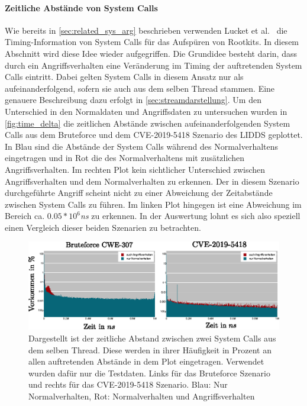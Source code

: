             \paragraph{Zeitliche Abstände von System Calls}

                Wie bereits in \autoref{sec:related_sys_arg} beschrieben verwenden Lucket et al.~\cite{TIMINGLUCKETT2016} die Timing-Information von System Calls für das Aufspüren von Rootkits.
                In diesem Abschnitt wird diese Idee wieder aufgegriffen.
                Die Grundidee besteht darin, dass durch ein Angriffsverhalten eine Veränderung im Timing der auftretenden System Calls eintritt.
                Dabei gelten System Calls in diesem Ansatz nur als aufeinanderfolgend, sofern sie auch aus dem selben Thread stammen.
                Eine genauere Beschreibung dazu erfolgt in \autoref{sec:streamdarstellung}.
                Um den Unterschied in den Normaldaten und Angriffsdaten zu untersuchen wurden in \autoref{fig:time_delta} die zeitlichen Abstände zwischen aufeinanderfolgenden System Calls aus dem Bruteforce und dem CVE-2019-5418 Szenario des \ac{LIDDS} geplottet.
                In Blau sind die Abstände der System Calls während des Normalverhaltens eingetragen und in Rot die des Normalverhaltens mit zusätzlichen Angriffsverhalten.
                Im rechten Plot kein sichtlicher Unterschied zwischen Angriffsverhalten und dem Normalverhalten zu erkennen.
                Der in diesem Szenario durchgeführte Angriff scheint nicht zu einer Abweichung der Zeitabstände zwischen System Calls zu führen.
                Im linken Plot hingegen ist eine Abweichung im Bereich ca. $0.05*10^{6}$\textit{ns} zu erkennen.
                In der Auswertung lohnt es sich also speziell einen Vergleich dieser beiden Szenarien zu betrachten.
                \begin{figure}
                    \centering
                    \includegraphics[width=\textwidth]{images/CVE-2012--Test-data-time_delta.eps}
                    \caption{Dargestellt ist der zeitliche Abstand zwischen zwei System Calls aus dem selben Thread.
                             Diese werden in ihrer Häufigkeit in Prozent an allen auftretenden Abstände in dem Plot eingetragen.
                             Verwendet wurden dafür nur die Testdaten. Links für das Bruteforce Szenario und rechts für das CVE-2019-5418 Szenario.
                             Blau: Nur Normalverhalten, Rot: Normalverhalten und Angriffsverhalten}
                    \label{fig:time_delta}
                \end{figure}

